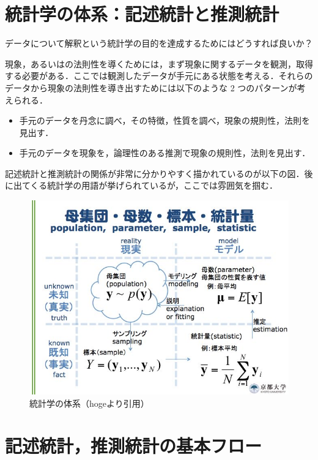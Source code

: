 \section{統計学の体系：記述統計と推測統計}

データについて解釈という統計学の目的を達成するためにはどうすれば良いか？

現象，あるいはの法則性を導くためには，まず現象に関するデータを観測，取得する必要がある．ここでは観測したデータが手元にある状態を考える．それらのデータから現象の法則性を導き出すためには以下のような 2 つのパターンが考えられる．

\begin{itemize}
    \item 手元のデータを丹念に調べ，その特徴，性質を調べ，現象の規則性，法則を見出す．
    \item 手元のデータを現象を，論理性のある推測で現象の規則性，法則を見出す．
\end{itemize}

記述統計と推測統計の関係が非常に分かりやすく描かれているのが以下の図．後に出てくる統計学の用語が挙げられているが，ここでは雰囲気を掴む．

\begin{figure}
    \begin{center}
        \includegraphics[width=15cm]{images/statistics_map.jpeg}
        \caption{統計学の体系（hogeより引用）}
    \end{center}
\end{figure}

\section{記述統計，推測統計の基本フロー}

